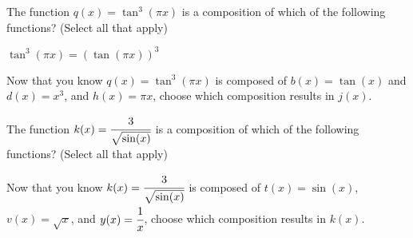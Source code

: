 \documentclass{ximera}
\begin{document}
\begin{problem}

    The function $q(x) = \tan^3(\pi x)$ is a composition of which of the following functions?  (Select all that apply)
    
    \begin{hint}
    
    $\tan^3(\pi x) = \left(\tan(\pi x)\right)^3$
    
    \end{hint}
    
        \begin{selectAll}
        \end{selectAll}
        
    \begin{problem}
        Now that you know $q(x) = \tan^3(\pi x)$ is composed of $b(x) = \tan(x)$ and $d(x) = x^3$, and $h(x) = \pi x$, choose which composition results in $j(x)$. 
        
            \begin{multipleChoice}
            \end{multipleChoice}
    \end{problem}
\end{problem}
    
\begin{problem}

    The function $k(x) = \cfrac{3}{\sqrt{\sin(x)}}$ is a composition of which of the following functions?  (Select all that apply)
    
        \begin{selectAll}
        \end{selectAll}
        
    \begin{problem}
        Now that you know $k(x) = \cfrac{3}{\sqrt{\sin(x)}}$ is composed of $t(x) = \sin(x)$, $v(x) = \sqrt{x}$, and $y(x) = \cfrac{1}{x}$, choose which composition results in $k(x)$. 
        
            \begin{multipleChoice}
            \end{multipleChoice}
    \end{problem}

\end{problem}
\end{document}
